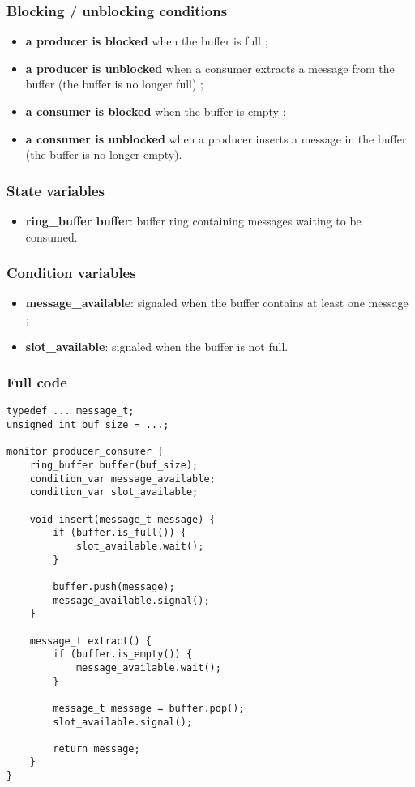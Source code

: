 \documentclass[a4paper, 12pt]{article}
\begin{document}
\subsubsection{Blocking / unblocking conditions}
\begin{itemize}
    \item \textbf{a producer is blocked} when the buffer is full ;
    \item \textbf{a producer is unblocked} when a consumer extracts a message from the
        buffer (the buffer is no longer full) ;
    \item \textbf{a consumer is blocked} when the buffer is empty ;
    \item \textbf{a consumer is unblocked} when a producer inserts a message in the
        buffer (the buffer is no longer empty).
\end{itemize}

\subsubsection{State variables}
\begin{itemize}
    \item \textbf{ring\_buffer buffer}: buffer ring containing messages waiting to be
        consumed.
\end{itemize}

\subsubsection{Condition variables}
\begin{itemize}
    \item \textbf{message\_available}: signaled when the buffer contains at
        least one message ;
    \item \textbf{slot\_available}: signaled when the buffer is not full.
\end{itemize}

\subsubsection{Full code}
\begin{lstlisting}
typedef ... message_t;
unsigned int buf_size = ...;

monitor producer_consumer {
    ring_buffer buffer(buf_size);
    condition_var message_available;
    condition_var slot_available;

    void insert(message_t message) {
        if (buffer.is_full()) {
            slot_available.wait();
        }

        buffer.push(message);
        message_available.signal();
    }

    message_t extract() {
        if (buffer.is_empty()) {
            message_available.wait();
        }

        message_t message = buffer.pop();
        slot_available.signal();

        return message;
    }
}
\end{lstlisting}
\end{document}
